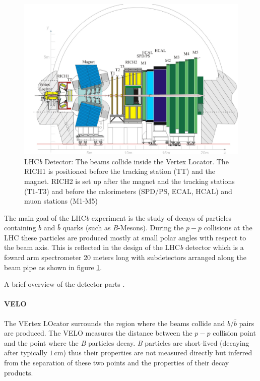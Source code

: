 \documentclass[11pt]{scrreprt}
\begin{document}
\begin{figure}[tb]
  \centering
  \includegraphics[width=\textwidth]{pics/lhcb_detector}
  \caption[LHC\textit{b} detector]{LHC\textit{b} Detector: The beams collide inside the Vertex Locator. The RICH1 is positioned before the tracking station (TT) and
  the magnet. RICH2 is set up after the magnet and the tracking stations (T1-T3) and before the calorimeters (SPD/PS, ECAL, HCAL) and muon stations (M1-M5)}
  \label{fig:lhcb}
\end{figure}

The main goal of the LHC\textit{b} experiment is the study of decays of particles containing $b$ and $\bar{b}$ quarks (such as \textit{B}-Mesons). During the $p-p$ collisions at the LHC these particles 
are produced mostly at small polar angles with respect to the beam axis. This is reflected in the design of the LHC\textit{b} detector 
which is a foward arm spectrometer 20 meters long with subdetectors arranged along the beam pipe as shown in figure \ref{fig:lhcb}.

A brief overview of the detector parts \parencite{lhcbweb}.

\paragraph{VELO} The VErtex LOcator surrounds the region where the beams collide and $b$/$\bar{b}$ pairs are produced. The VELO measures the 
distance between the $p-p$ collision point and the point where the \textit{B} particles decay. \textit{B} particles are short-lived (decaying after typically
$1$\,cm) thus their properties are not measured directly but inferred from the separation of these two points and the properties of 
their decay products.
\end{document}
